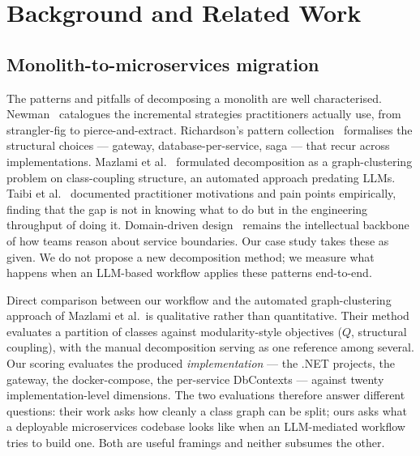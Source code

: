 \documentclass[journal]{IEEEtran}
\begin{document}
\section{Background and Related Work}
\label{sec:related}

\subsection{Monolith-to-microservices migration}

The patterns and pitfalls of decomposing a monolith are well
characterised. Newman~\cite{newman2019monolith} catalogues the
incremental strategies practitioners actually use, from
strangler-fig to pierce-and-extract. Richardson's pattern
collection~\cite{richardson2018patterns} formalises the structural
choices --- gateway, database-per-service, saga --- that recur
across implementations. Mazlami et al.~\cite{mazlami2017extraction}
formulated decomposition as a graph-clustering problem on
class-coupling structure, an automated approach predating LLMs.
Taibi et al.~\cite{taibi2017processes} documented practitioner
motivations and pain points empirically, finding that the gap is
not in knowing what to do but in the engineering throughput of
doing it. Domain-driven design~\cite{evans2003ddd} remains the
intellectual backbone of how teams reason about service boundaries.
Our case study takes these as given. We do not propose a new
decomposition method; we measure what happens when an LLM-based
workflow applies these patterns end-to-end.

Direct comparison between our workflow and the automated
graph-clustering approach of Mazlami et al.\ is qualitative
rather than quantitative. Their method evaluates a partition of
classes against modularity-style objectives ($Q$, structural
coupling), with the manual decomposition serving as one reference
among several. Our scoring evaluates the produced
\emph{implementation} --- the .NET projects, the gateway, the
docker-compose, the per-service DbContexts --- against twenty
implementation-level dimensions. The two evaluations therefore
answer different questions: their work asks how cleanly a class
graph can be split; ours asks what a deployable microservices
codebase looks like when an LLM-mediated workflow tries to build
one. Both are useful framings and neither subsumes the other.
\end{document}
